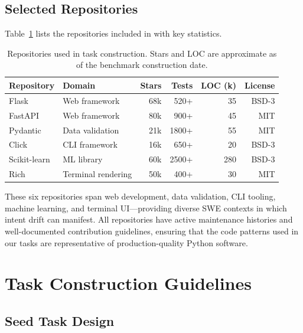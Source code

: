 \subsection{Selected Repositories}

Table~\ref{tab:repos} lists the repositories included in \bench{} with key statistics.

\begin{table}[h]
\centering
\small
\caption{Repositories used in \bench{} task construction. Stars and LOC are approximate as of the benchmark construction date.}
\label{tab:repos}
\begin{tabular}{llrrrr}
\toprule
\textbf{Repository} & \textbf{Domain} & \textbf{Stars} & \textbf{Tests} & \textbf{LOC (k)} & \textbf{License} \\
\midrule
Flask         & Web framework      & 68k  & 520+  & 35  & BSD-3     \\
FastAPI       & Web framework      & 80k  & 900+  & 45  & MIT       \\
Pydantic      & Data validation    & 21k  & 1800+ & 55  & MIT       \\
Click         & CLI framework      & 16k  & 650+  & 20  & BSD-3     \\
Scikit-learn  & ML library         & 60k  & 2500+ & 280 & BSD-3     \\
Rich          & Terminal rendering & 50k  & 400+  & 30  & MIT       \\
\bottomrule
\end{tabular}
\end{table}

\noindent These six repositories span web development, data validation, CLI tooling, machine learning, and terminal UI---providing diverse SWE contexts in which intent drift can manifest. All repositories have active maintenance histories and well-documented contribution guidelines, ensuring that the code patterns used in our tasks are representative of production-quality Python software.


\section{Task Construction Guidelines}
\label{app:task-construction}

\subsection{Seed Task Design}

